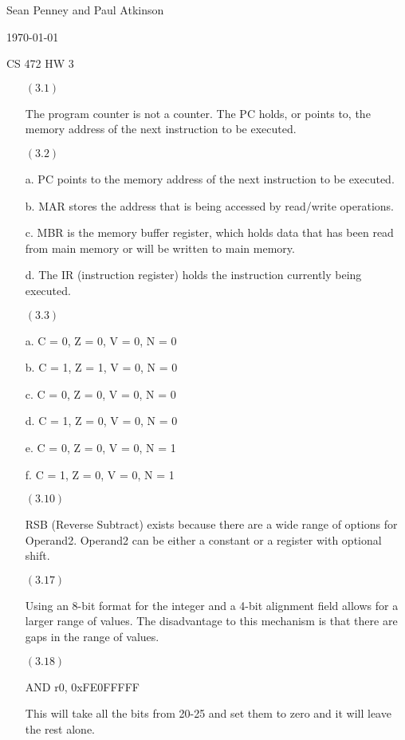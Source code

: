 \documentclass[letterpaper,10pt,titlepage]{article}
\def\name{Sean Penney and Paul Atkinson}
\begin{document}
\hfill \name

\hfill \today

\hfill CS 472 HW 3

\begin{enumerate}
\item[$(3.1)$] 

  The program counter is not a counter.  The PC holds, or points to, the memory address of the next instruction to be executed.

\item[$(3.2)$]

  a.  PC points to the memory address of the next instruction to be executed.
  
  b.  MAR stores the address that is being accessed by read/write operations.
  
  c.  MBR is the memory buffer register, which holds data that has been read from main memory or will be written to main memory.
  
  d.  The IR (instruction register) holds the instruction currently being executed.

\item[$(3.3)$]

  a.  C = 0, Z = 0, V = 0, N = 0
  
  b.  C = 1, Z = 1, V = 0, N = 0
  
  c.  C = 0, Z = 0, V = 0, N = 0
  
  d.  C = 1, Z = 0, V = 0, N = 0
  
  e.  C = 0, Z = 0, V = 0, N = 1
  
  f.  C = 1, Z = 0, V = 0, N = 1
  
\item[$(3.10)$]
  
  RSB (Reverse Subtract) exists because there are a wide range of options for Operand2. Operand2 can be either a constant or a 
  register with optional shift.
  
\item[$(3.17)$]

  Using an 8-bit format for the integer and a 4-bit alignment field allows for a larger range of values.
  The disadvantage to this mechanism is that there are gaps in the range of values.

\item[$(3.18)$]
  
  AND r0, 0xFE0FFFFF
  
  This will take all the bits from 20-25 and set them to zero and it will leave the rest alone.
  

\end{enumerate}
\end{document}
